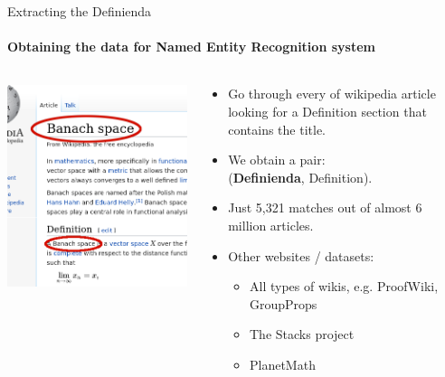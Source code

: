 \documentclass[10pt]{beamer}
\begin{document}
\begin{frame}{Extracting the Definienda}
    \framesubtitle{Obtaining the data for Named Entity Recognition system}
    \begin{columns}[T]
        \begin{column}{0.5\textwidth}
    \includegraphics[width=\textwidth]{wiki_thin_banach.png}
        \end{column}
        \begin{column}{0.5\textwidth}
            \begin{itemize}
            \item Go through every of wikipedia article looking for a Definition section that contains the title.
            \item We obtain a pair:\\
                (\textbf{Definienda},  Definition).
            \item Just 5,321 matches out of almost 6 million articles.
            \item Other websites / datasets:
                \begin{itemize}
                    \item All types of wikis, e.g. ProofWiki, GroupProps
                    \item The Stacks project
                    \item PlanetMath
                \end{itemize}
            \end{itemize}
        \end{column}
    \end{columns}
\end{frame}
\end{document}
